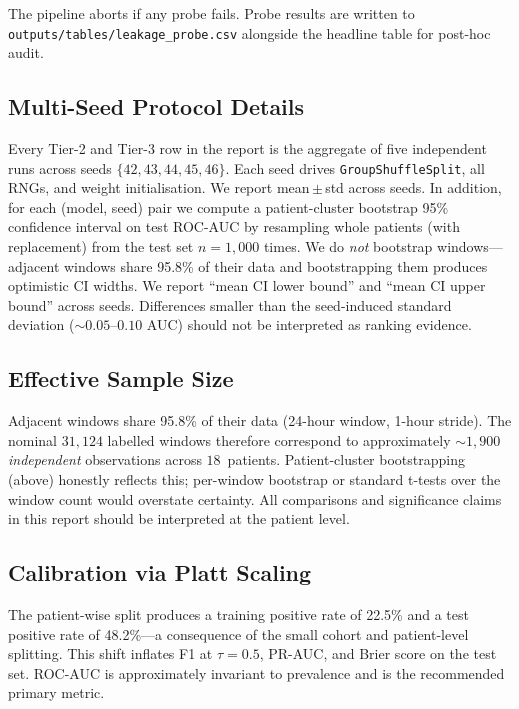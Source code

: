 \documentclass[11pt,a4paper]{article}
\begin{document}
The pipeline aborts if any probe fails.  Probe results are written to
\texttt{outputs/tables/leakage\_probe.csv} alongside the headline table for
post-hoc audit.

\subsection{Multi-Seed Protocol Details}\label{sec:multi-seed-detail}

Every Tier-2 and Tier-3 row in the report is the aggregate of five
independent runs across seeds $\{42, 43, 44, 45, 46\}$.  Each seed drives
\texttt{GroupShuffleSplit}, all RNGs, and weight initialisation.  We report
mean\,$\pm$\,std across seeds.  In addition, for each (model, seed) pair we
compute a patient-cluster bootstrap 95\% confidence interval on test ROC-AUC
by resampling whole patients (with replacement) from the test set
$n{=}1{,}000$ times.  We do \emph{not} bootstrap windows---adjacent windows
share 95.8\% of their data and bootstrapping them produces optimistic CI
widths.  We report ``mean CI lower bound'' and ``mean CI upper bound''
across seeds.  Differences smaller than the seed-induced standard deviation
(${\sim}0.05$--$0.10$ AUC) should not be interpreted as ranking evidence.

\subsection{Effective Sample Size}\label{sec:effective_n}

Adjacent windows share 95.8\% of their data (24-hour window, 1-hour
stride).  The nominal $31{,}124$ labelled windows therefore correspond to
approximately ${\sim}1{,}900$ \emph{independent} observations across
$18$~patients.  Patient-cluster bootstrapping (above) honestly reflects
this; per-window bootstrap or standard t-tests over the window count would
overstate certainty.  All comparisons and significance claims in this
report should be interpreted at the patient level.

\subsection{Calibration via Platt Scaling}\label{sec:platt}

The patient-wise split produces a training positive rate of 22.5\% and a
test positive rate of 48.2\%---a consequence of the small cohort and
patient-level splitting.  This shift inflates F1 at $\tau{=}0.5$, PR-AUC,
and Brier score on the test set.  ROC-AUC is approximately invariant to
prevalence and is the recommended primary metric.
\end{document}
